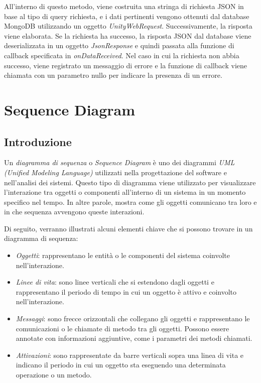 All'interno di questo metodo, viene costruita una stringa di richiesta JSON in base al tipo di query richiesta, e i dati pertinenti vengono ottenuti dal database MongoDB utilizzando un oggetto \textit{UnityWebRequest}. Successivamente, la risposta viene elaborata. Se la richiesta ha successo, la risposta JSON dal database viene deserializzata in un oggetto \textit{JsonResponse} e quindi passata alla funzione di callback specificata in \textit{onDataReceived}. Nel caso in cui la richiesta non abbia successo, viene registrato un messaggio di errore e la funzione di callback viene chiamata con un parametro nullo per indicare la presenza di un errore.

\section{Sequence Diagram}

\subsection{Introduzione}

Un \textit{diagramma di sequenza} o \textit{Sequence Diagram} è uno dei diagrammi \textit{UML (Unified Modeling Language)} utilizzati nella progettazione del software e nell'analisi dei sistemi. Questo tipo di diagramma viene utilizzato per visualizzare l'interazione tra oggetti o componenti all'interno di un sistema in un momento specifico nel tempo. In altre parole, mostra come gli oggetti comunicano tra loro e in che sequenza avvengono queste interazioni.

Di seguito, verranno illustrati alcuni elementi chiave che si possono trovare in un diagramma di sequenza:

\begin{itemize}
    \item \textit{Oggetti}: rappresentano le entità o le componenti del sistema coinvolte nell'interazione.
    \item \textit{Linee di vita}: sono linee verticali che si estendono dagli oggetti e rappresentano il periodo di tempo in cui un oggetto è attivo e coinvolto nell'interazione.
    \item \textit{Messaggi}: sono frecce orizzontali che collegano gli oggetti e rappresentano le comunicazioni o le chiamate di metodo tra gli oggetti. Possono essere annotate con informazioni aggiuntive, come i parametri dei metodi chiamati.
    \item \textit{Attivazioni}: sono rappresentate da barre verticali sopra una linea di vita e indicano il periodo in cui un oggetto sta eseguendo una determinata operazione o un metodo.
\end{itemize}

